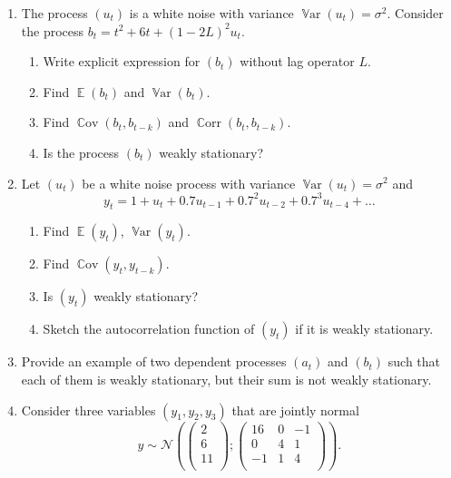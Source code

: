 \documentclass[12pt]{article}
\DeclareMathOperator{\Cov}{\mathbb{C}ov}
\DeclareMathOperator{\Corr}{\mathbb{C}orr}
\DeclareMathOperator{\Var}{\mathbb{V}ar}
\DeclareMathOperator{\E}{\mathbb{E}}
\newcommand \cN{\mathcal{N}}
\begin{document}
\begin{enumerate}
  \item The process $(u_t)$ is a white noise with variance $\Var(u_t) = \sigma^2$. 
  Consider the process $b_t = t^2 + 6t + (1-2L)^2 u_t$. %
  
  \begin{enumerate}
    \item Write explicit expression for $(b_t)$ without lag operator $L$.
    \item Find $\E(b_t)$ and $\Var(b_t)$.
    \item Find $\Cov(b_t, b_{t-k})$ and $\Corr(b_t, b_{t-k})$.
    \item Is the process $(b_t)$ weakly stationary?    
  \end{enumerate}

  \item Let $(u_t)$ be a white noise process with variance $\Var(u_t) = \sigma^2$ and 
  \[
  y_t = 1 + u_t + 0.7u_{t-1} + 0.7^2 u_{t-2} + 0.7^3 u_{t-4} + \ldots  
  \]
  \begin{enumerate}
    \item Find $\E(y_t)$, $\Var(y_t)$.
    \item Find $\Cov(y_t, y_{t-k})$.
    \item Is $(y_t)$ weakly stationary?
    \item Sketch the autocorrelation function of $(y_t)$ if it is weakly stationary.
  \end{enumerate}




  \item Provide an example of two dependent processes $(a_t)$ and $(b_t)$ such that each of them is weakly stationary, 
  but their sum is not weakly stationary. 


  \item Consider three variables $(y_1, y_2, y_3)$ that are jointly normal
  \[
  y \sim \cN\left( \begin{pmatrix}
    2 \\
    6 \\
    11 \\
  \end{pmatrix}; \begin{pmatrix}
    16 & 0 & -1 \\
    0 & 4 & 1 \\
    -1 & 1 & 4 \\
  \end{pmatrix}  \right).  
  \]


\end{enumerate}
\end{document}
